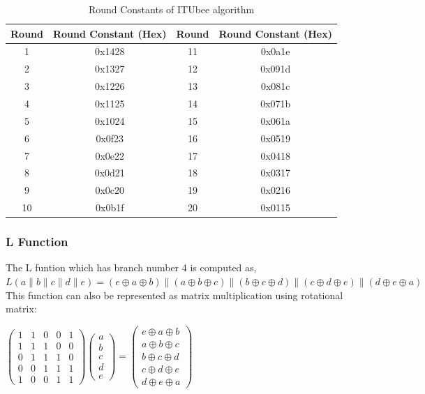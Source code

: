 \documentclass[11pt,a4paper]{article}
\begin{document}
\begin{table}[H]
    \centering
    \begin{tabular}{|c|c|c|c|}
        \hline
        \textbf{Round} & \textbf{Round Constant (Hex)} & \textbf{Round} & \textbf{Round Constant (Hex)} \\
        \hline
        1  & 0x1428 & 11 & 0x0a1e \\
        2  & 0x1327 & 12 & 0x091d \\
        3  & 0x1226 & 13 & 0x081c \\
        4  & 0x1125 & 14 & 0x071b \\
        5  & 0x1024 & 15 & 0x061a \\
        6  & 0x0f23 & 16 & 0x0519 \\
        7  & 0x0e22 & 17 & 0x0418 \\
        8  & 0x0d21 & 18 & 0x0317 \\
        9  & 0x0c20 & 19 & 0x0216 \\
        10 & 0x0b1f & 20 & 0x0115 \\
        \hline
    \end{tabular}
    \caption{Round Constants of ITUbee algorithm}
    \label{tab:ITUbee_rc}
\end{table}

\subsubsection{L Function}
The L funtion which has branch number 4 is computed as,\\
$L(a \parallel b \parallel c \parallel d \parallel e) = (e \oplus a \oplus b) \parallel (a \oplus b \oplus c) \parallel (b \oplus c \oplus d) \parallel (c \oplus d \oplus e) \parallel (d \oplus e \oplus a)$
\\This function can also be represented as matrix multiplication using rotational matrix:

\begin{center}
    $
    \begin{pmatrix}
    1 & 1 & 0 & 0 & 1 \\
    1 & 1 & 1 & 0 & 0 \\
    0 & 1 & 1 & 1 & 0 \\
    0 & 0 & 1 & 1 & 1 \\
    1 & 0 & 0 & 1 & 1
    \end{pmatrix}
    \begin{pmatrix}
    a \\
    b \\
    c \\
    d \\
    e
    \end{pmatrix}
    =
    \begin{pmatrix}
    e \oplus a \oplus b \\
    a \oplus b \oplus c \\
    b \oplus c \oplus d \\
    c \oplus d \oplus e \\
    d \oplus e \oplus a
    \end{pmatrix}
    $
\end{center}
\end{document}
